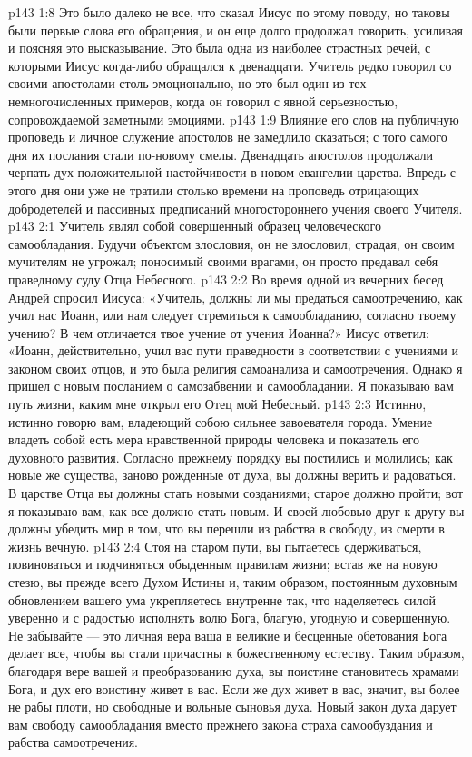 \vs p143 1:8 \pc Это было далеко не все, что сказал Иисус по этому поводу, но таковы были первые слова его обращения, и он еще долго продолжал говорить, усиливая и поясняя это высказывание. Это была одна из наиболее страстных речей, с которыми Иисус когда\hyp{}либо обращался к двенадцати. Учитель редко говорил со своими апостолами столь эмоционально, но это был один из тех немногочисленных примеров, когда он говорил с явной серьезностью, сопровождаемой заметными эмоциями.
\vs p143 1:9 \pc Влияние его слов на публичную проповедь и личное служение апостолов не замедлило сказаться; с того самого дня их послания стали по\hyp{}новому смелы. Двенадцать апостолов продолжали черпать дух положительной настойчивости в новом евангелии царства. Впредь с этого дня они уже не тратили столько времени на проповедь отрицающих добродетелей и пассивных предписаний многостороннего учения своего Учителя.
\vs p143 2:1 Учитель являл собой совершенный образец человеческого самообладания. Будучи объектом злословия, он не злословил; страдая, он своим мучителям не угрожал; поносимый своими врагами, он просто предавал себя праведному суду Отца Небесного.
\vs p143 2:2 \pc Во время одной из вечерних бесед Андрей спросил Иисуса: «Учитель, должны ли мы предаться самоотречению, как учил нас Иоанн, или нам следует стремиться к самообладанию, согласно твоему учению? В чем отличается твое учение от учения Иоанна?» Иисус ответил: «Иоанн, действительно, учил вас пути праведности в соответствии с учениями и законом своих отцов, и это была религия самоанализа и самоотречения. Однако я пришел с новым посланием о самозабвении и самообладании. Я показываю вам путь жизни, каким мне открыл его Отец мой Небесный.
\vs p143 2:3 Истинно, истинно говорю вам, владеющий собою сильнее завоевателя города. Умение владеть собой есть мера нравственной природы человека и показатель его духовного развития. Согласно прежнему порядку вы постились и молились; как новые же существа, заново рожденные от духа, вы должны верить и радоваться. В царстве Отца вы должны стать новыми созданиями; старое должно пройти; вот я показываю вам, как все должно стать новым. И своей любовью друг к другу вы должны убедить мир в том, что вы перешли из рабства в свободу, из смерти в жизнь вечную.
\vs p143 2:4 Стоя на старом пути, вы пытаетесь сдерживаться, повиноваться и подчиняться обыденным правилам жизни; встав же на новую стезю, вы прежде всего  Духом Истины и, таким образом, постоянным духовным обновлением вашего ума укрепляетесь внутренне так, что наделяетесь силой уверенно и с радостью исполнять волю Бога, благую, угодную и совершенную. Не забывайте --- это личная вера ваша в великие и бесценные обетования Бога делает все, чтобы вы стали причастны к божественному естеству. Таким образом, благодаря вере вашей и преобразованию духа, вы поистине становитесь храмами Бога, и дух его воистину живет в вас. Если же дух живет в вас, значит, вы более не рабы плоти, но свободные и вольные сыновья духа. Новый закон духа дарует вам свободу самообладания вместо прежнего закона страха самообуздания и рабства самоотречения.
